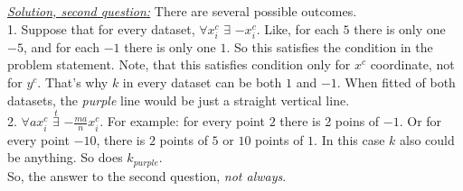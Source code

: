 \documentclass[a4paper,12pt]{article}
\begin{document}
\underline{\textit{Solution, second question:}} There are several possible
outcomes. \\


1. Suppose that for every dataset, $\forall x^c_i$ $\exists$ $-x^c_i$.  Like,
for each $5$ there is only one $-5$, and for each $-1$ there is only one $1$.
So this satisfies the condition in the problem statement. Note, that this
satisfies condition only for $x^c$ coordinate, not for $y^c$. That's why $k$ in
every dataset can be both $1$ and $-1$. When fitted of both datasets, the
\textit{purple} line would be just a straight vertical line.\\

2. $\forall ax^c_i$ $\overset{t}{\exists}$ $-\frac{ma}{n}x^c_i$. For example:
for every point $2$ there is 2 poins of $-1$. Or for every point $-10$, there
is $2$ points of $5$ or $10$ points of $1$. In this case $k$ also could be
anything. So does $k_{purple}$.\\

So, the answer to the second question, \textit{not always}.
\end{document}
